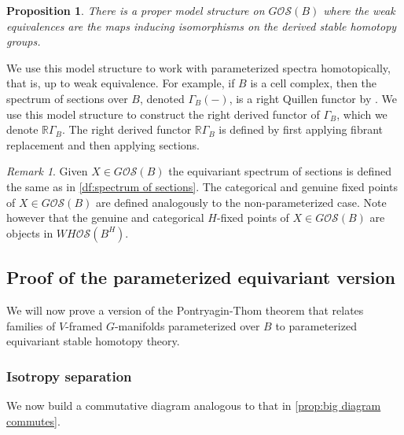 \documentclass[11pt]{amsart}
\newcommand{\beforesubsection}{\vspace{1em}}
\newcommand{\aftersubsection}{}
\newcommand{\R}{\mathbb R}
\newcommand{\Osp}{\mathcal{OS}}
\theoremstyle{plain}   %
\newtheorem{prop}[thm]{Proposition}
\theoremstyle{definition}
\theoremstyle{remark}
\newtheorem{rmk}[thm]{Remark}
\numberwithin{equation}{section}
\begin{document}
\begin{prop}\cite[7.4.2]{malkiewich_convenient}\label{prop:model for parameterized G-spectra}
There is a proper model structure on $G\Osp(B)$ where the weak equivalences are the maps inducing isomorphisms on the derived stable homotopy groups. 
\end{prop}

We use this model structure to work with parameterized spectra homotopically, that is, up to weak equivalence. For example, if $B$ is a cell complex, then the spectrum of sections over $B$, denoted $\Gamma_B(-)$, is a right Quillen functor by \cite[Lemma 5.4.4]{malkiewich_convenient}. We use this model structure to construct the right derived functor of $\Gamma_B$, which we denote $\R\Gamma_B$. The right derived functor $\R\Gamma_B$ is defined by first applying fibrant replacement and then applying sections. 

\begin{rmk}
Given $X\in G\Osp(B)$ the equivariant spectrum of sections is defined the same as in \cref{df:spectrum of sections}. The categorical and genuine fixed points of $X\in G\Osp(B)$ are defined analogously to the non-parameterized case. Note however that the genuine and categorical $H$-fixed points of $X\in G\Osp(B)$ are objects in $WH\Osp(B^H)$. 
\end{rmk}



\beforesubsection
\subsection{Proof of the parameterized equivariant version}\aftersubsection

We will now prove a version of the Pontryagin-Thom theorem that relates families of $V$-framed $G$-manifolds parameterized over $B$ to parameterized equivariant stable homotopy theory. 

\beforesubsection 
\subsubsection{Isotropy separation}\aftersubsection

We now build a commutative diagram analogous to that in \cref{prop:big diagram commutes}.
\end{document}
